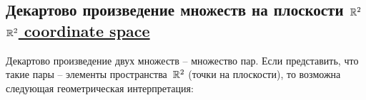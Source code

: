 \documentclass[a4paper,10pt]{article}
\begin{document}
\subsection{Декартово произведение множеств на плоскости \texorpdfstring{$\mathbb{R}^2$}{R\string^2}%
\texorpdfstring{\hfill\normalfont\href{https://en.wikipedia.org/wiki/Real_coordinate_space}{$\mathbb{R}^2$ coordinate space}}{}}

Декартово произведение двух множеств \--- множество пар. Если представить, что такие пары \--- элементы пространства~$\mathbb{R}^2$ (точки на плоскости), то возможна следующая геометрическая интерпретация:

\end{document}
